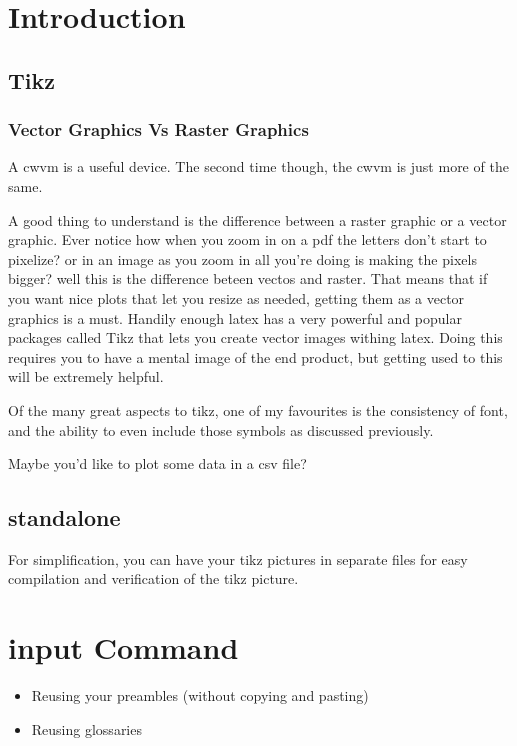 \documentclass[hidelinks, float=false, crop=false]{standalone}
\begin{document}
{}
    \section{Introduction}
        \subsection{Tikz}
            \subsubsection{Vector Graphics Vs Raster Graphics}
                A \gls{cwvm} is a useful device.
                The second time though, the \gls{cwvm} is just more of the same.

                A good thing to understand is the difference between a raster graphic or a vector graphic. Ever notice how when you zoom in on a pdf the letters don't start to pixelize? or in an image as you zoom in all you're doing is making the pixels bigger? well this is the difference beteen vectos and raster. That means that if you want nice plots that let you resize as needed, getting them as a vector graphics is a must. Handily enough latex has a very powerful and popular packages called Tikz that lets you create vector images withing latex. Doing this requires you to have a mental image of the end product, but getting used to this will be extremely helpful.

                Of the many great aspects to tikz, one of my favourites is the consistency of font, and the ability to even include those symbols as discussed previously.


                Maybe you'd like to plot some data in a csv file?

        \subsection{standalone}
            For simplification, you can have your tikz pictures in separate files for easy compilation and verification of the tikz picture.

    \section{input Command}
        \begin{itemize}
            \item Reusing your preambles (without copying and pasting)
            \item Reusing glossaries
        \end{itemize}
\end{document}

